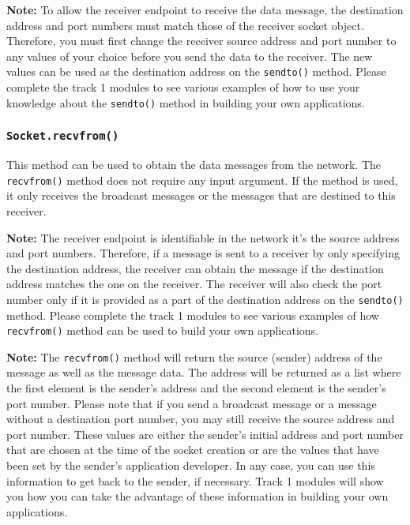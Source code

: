 \documentclass[11pt]{article}
\begin{document}
\textbf{Note:}
To allow the receiver endpoint to receive the data message, the destination address and port numbers must match those of the receiver socket object. Therefore, you must first change the receiver source address and port number to any values of your choice before you send the data to the receiver. The new values can be used as the destination address on the \texttt{sendto()} method. Please complete the track 1 modules to see various examples of how to use your knowledge about the \texttt{sendto()} method in building your own applications.

\subsubsection{\texttt{Socket.\textbf{recvfrom()}}}
This method can be used to obtain the data messages from the network. The \texttt{recvfrom()} method does not require any input argument. If the method is used, it only receives the broadcast messages or the messages that are destined to this receiver. 

\textbf{Note:}
The receiver endpoint is identifiable in the network it's the source address and port numbers. Therefore, if a message is sent to a receiver by only specifying the destination address, the receiver can obtain the message if the destination address matches the one on the receiver. The receiver will also check the port number only if it is provided as a part of the destination address on the \texttt{sendto()} method. Please complete the track 1 modules to see various examples of how \texttt{recvfrom()} method can be used to build your own applications.

\textbf{Note:} 
The \texttt{recvfrom()} method will return the source (sender) address of the message as well as the message data. The address will be returned as a list where the first element is the sender's address and the second element is the sender's port number. Please note that if you send a broadcast message or a message without a destination port number, you may still receive the source address and port number. These values are either the sender's initial address and port number that are chosen at the time of the socket creation or are the values that have been set by the sender's application developer. In any case, you can use this information to get back to the sender, if necessary. Track 1 modules will show you how you can take the advantage of these information in building your own applications.
\end{document}
